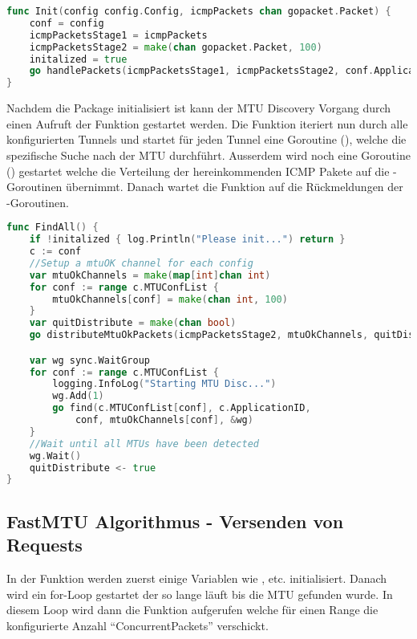 \begin{lstlisting}[language=go, caption=mtu.Init(..) Funktion]                    
func Init(config config.Config, icmpPackets chan gopacket.Packet) {
	conf = config
	icmpPacketsStage1 = icmpPackets
	icmpPacketsStage2 = make(chan gopacket.Packet, 100)
	initalized = true
	go handlePackets(icmpPacketsStage1, icmpPacketsStage2, conf.ApplicationID)
}
\end{lstlisting}

Nachdem die Package initialisiert ist kann der \ac{MTU} Discovery Vorgang durch einen Aufruft der  Funktion gestartet werden. Die  Funktion iteriert nun durch alle konfigurierten Tunnels und startet für jeden Tunnel eine Goroutine (), welche die spezifische Suche nach der \ac{MTU} durchführt.
Ausserdem wird noch eine Goroutine () gestartet welche die Verteilung der hereinkommenden \ac{ICMP} Pakete auf die -Goroutinen übernimmt.
Danach wartet die  Funktion auf die Rückmeldungen der -Goroutinen.

\begin{lstlisting}[language=go, caption=mtu.FindAll(..) Funktion]                    
func FindAll() {
	if !initalized { log.Println("Please init...") return }
	c := conf
	//Setup a mtuOK channel for each config
	var mtuOkChannels = make(map[int]chan int)
	for conf := range c.MTUConfList {
		mtuOkChannels[conf] = make(chan int, 100)
	}
	var quitDistribute = make(chan bool)
	go distributeMtuOkPackets(icmpPacketsStage2, mtuOkChannels, quitDistribute)

	var wg sync.WaitGroup
	for conf := range c.MTUConfList {
		logging.InfoLog("Starting MTU Disc...")
		wg.Add(1)
		go find(c.MTUConfList[conf], c.ApplicationID,
			conf, mtuOkChannels[conf], &wg)
	}
	//Wait until all MTUs have been detected
	wg.Wait()
	quitDistribute <- true
}
\end{lstlisting}

\subsection{FastMTU Algorithmus - Versenden von Requests}
In der  Funktion werden zuerst einige Variablen wie ,  etc. initialisiert. Danach wird ein for-Loop gestartet der so lange läuft bis die \ac{MTU} gefunden wurde. In diesem Loop wird dann die  Funktion aufgerufen welche für einen Range die konfigurierte Anzahl \enquote{ConcurrentPackets} verschickt.

